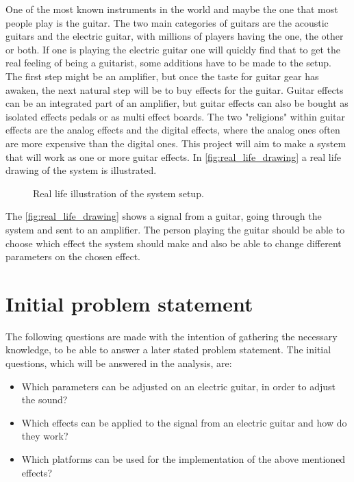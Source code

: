 One of the most known instruments in the world and maybe the one that most people play is the guitar. The two main categories of guitars are the acoustic guitars and the electric guitar, with millions of players having the one, the other or both. If one is playing the electric guitar one will quickly find that to get the real feeling of being a guitarist, some additions have to be made to the setup. The first step might be an amplifier, but once the taste for guitar gear has awaken, the next natural step will be to buy effects for the guitar. Guitar effects can be an integrated part of an amplifier, but guitar effects can also be bought as isolated effects pedals or as multi effect boards. The two "religions" within guitar effects are the analog effects and the digital effects, where the analog ones often are more expensive than the digital ones. 
This project will aim to make a system that will work as one or more guitar effects. In \autoref{fig:real_life_drawing} a real life drawing of the system is illustrated.

\begin{figure}[htbp!]
\centering
\def\svgwidth{\columnwidth}
\scalebox{0.6}{}
\caption{Real life illustration of the system setup.}
		\label{fig:real_life_drawing}
\end{figure}

The \autoref{fig:real_life_drawing} shows a signal from a guitar, going through the system and sent to an amplifier. The person playing the guitar should be able to choose which effect the system should make and also be able to change different parameters on the chosen effect. 



\section{Initial problem statement}
The following questions are made with the intention of gathering the necessary knowledge, to be able to answer a later stated problem statement. The initial questions, which will be answered in the analysis, are:

\begin{itemize}
\item Which parameters can be adjusted on an electric guitar, in order to adjust the sound?
\item Which effects can be applied to the signal from an electric guitar and how do they work?
\item Which platforms can be used for the implementation of the above mentioned effects? 
\end{itemize}